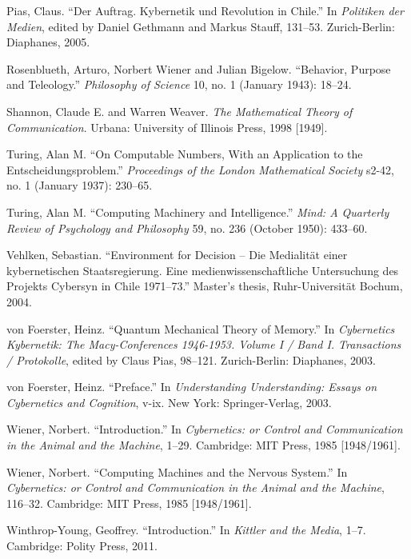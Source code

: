 \documentclass{tufte-handout}
\begin{document}
\begin{hangparas}{.25in}{1}
Pias, Claus. ``Der Auftrag. Kybernetik und Revolution in Chile.'' In
\emph{Politiken der Medien}, edited by Daniel Gethmann and Markus
Stauff, 131--53. Zurich-Berlin: Diaphanes, 2005.

Rosenblueth, Arturo, Norbert Wiener and Julian Bigelow. ``Behavior,
Purpose and Teleology.'' \emph{Philosophy of Science} 10, no. 1 (January
1943): 18--24.

Shannon, Claude E. and Warren Weaver. \emph{The Mathematical Theory of
Communication}. Urbana: University of Illinois Press, 1998 {[}1949{]}.

Turing, Alan M. ``On Computable Numbers, With an Application to the
Entscheidungsproblem.'' \emph{Proceedings of the London Mathematical
Society} s2-42, no. 1 (January 1937): 230--65.

Turing, Alan M. ``Computing Machinery and Intelligence.'' \emph{Mind: A
Quarterly Review of Psychology and Philosophy} 59, no. 236 (October
1950): 433--60.

Vehlken, Sebastian. ``Environment for Decision -- Die Medialität einer
kybernetischen Staatsregierung. Eine medienwissenschaftliche
Untersuchung des Projekts Cybersyn in Chile 1971--73.'' Master's thesis,
Ruhr-Universität Bochum, 2004.

von Foerster, Heinz. ``Quantum Mechanical Theory of Memory.'' In
\emph{Cybernetics \textbar{} Kybernetik: The Macy-Conferences 1946-1953.
Volume I / Band I. Transactions / Protokolle}, edited by Claus Pias,
98--121. Zurich-Berlin: Diaphanes, 2003.

von Foerster, Heinz. ``Preface.'' In \emph{Understanding Understanding:
Essays on Cybernetics and Cognition}, v-ix. New York: Springer-Verlag,
2003.

Wiener, Norbert. ``Introduction.'' In \emph{Cybernetics: or Control and
Communication in the Animal and the Machine}, 1--29. Cambridge: MIT
Press, 1985 {[}1948/1961{]}.

Wiener, Norbert. ``Computing Machines and the Nervous System.'' In
\emph{Cybernetics: or Control and Communication in the Animal and the
Machine}, 116--32. Cambridge: MIT Press, 1985 {[}1948/1961{]}.

Winthrop-Young, Geoffrey. ``Introduction.'' In \emph{Kittler and the
Media}, 1--7. Cambridge: Polity Press, 2011.



\end{hangparas}
\end{document}
